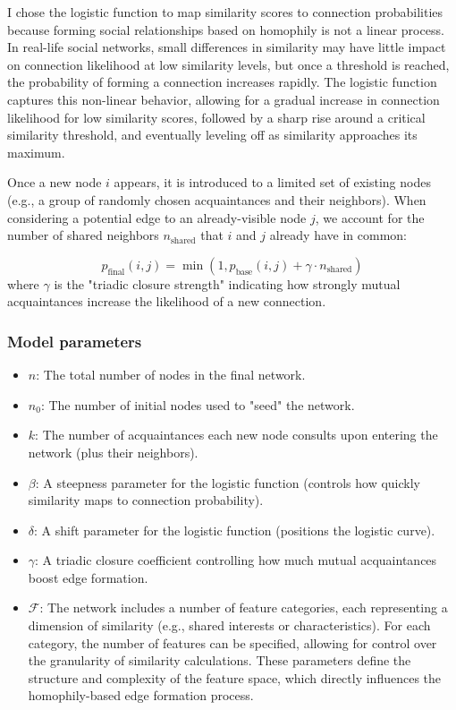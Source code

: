\documentclass[runningheads]{llncs}
\begin{document}
I chose the logistic function to map similarity scores to connection probabilities because forming social relationships based on homophily is not a linear process. In real-life social networks, small differences in similarity may have little impact on connection likelihood at low similarity levels, but once a threshold is reached, the probability of forming a connection increases rapidly. The logistic function captures this non-linear behavior, allowing for a gradual increase in connection likelihood for low similarity scores, followed by a sharp rise around a critical similarity threshold, and eventually leveling off as similarity approaches its maximum.

Once a new node $i$ appears, it is introduced to a limited set of existing nodes (e.g., a group of randomly chosen acquaintances and their neighbors). When considering a potential edge to an already-visible node $j$, we account for the number of shared neighbors $n_{\text{shared}}$ that $i$ and $j$ already have in common:

\begin{equation}\label{eq:final_probability}
p_{\text{final}}(i, j) = \min(1, p_{\text{base}}(i, j) + \gamma \cdot n_{\text{shared}})
\end{equation}
where $\gamma$ is the "triadic closure strength" indicating how strongly mutual acquaintances increase the likelihood of a new connection.

\subsubsection{Model parameters}
\begin{itemize}
    \item $n$: The total number of nodes in the final network.
    \item $n_0$: The number of initial nodes used to "seed" the network.
    \item $k$: The number of acquaintances each new node consults upon entering the network (plus their neighbors).
    \item $\beta$: A steepness parameter for the logistic function (controls how quickly similarity maps to connection probability).
    \item $\delta$: A shift parameter for the logistic function (positions the logistic curve).
    \item $\gamma$: A triadic closure coefficient controlling how much mutual acquaintances boost edge formation.
    \item $\mathcal{F}$: The network includes a number of feature categories, each representing a dimension of similarity (e.g., shared interests or characteristics). For each category, the number of features can be specified, allowing for control over the granularity of similarity calculations. These parameters define the structure and complexity of the feature space, which directly influences the homophily-based edge formation process.
\end{itemize}
\end{document}

